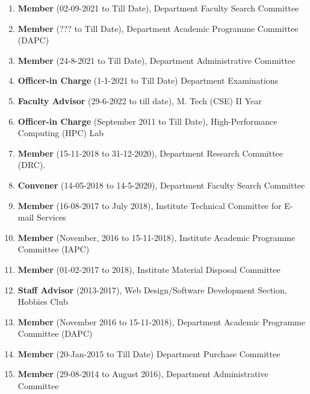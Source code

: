 \begin{enumerate}

\item
\textbf{Member} (02-09-2021 to Till Date), Department Faculty Search Committee

\item
\textbf{Member} (??? to Till Date), Department Academic Programme Committee (DAPC)

\item
\textbf{Member} (24-8-2021 to Till Date), Department Administrative Committee

\item
\textbf{Officer-in Charge} (1-1-2021 to Till Date) Department Examinations

\item 
\textbf{Faculty Advisor} (29-6-2022 to till date), M. Tech (CSE) II Year

\item
\textbf{Officer-in Charge} (September 2011 to Till Date), High-Performance Computing (HPC) Lab 

\item
\textbf{Member} (15-11-2018 to 31-12-2020), Department Research Committee (DRC).

\item
\textbf{Convener} (14-05-2018 to 14-5-2020), Department Faculty Search Committee

\item
\textbf{Member} (16-08-2017 to July 2018), Institute Technical Committee for E-mail Services

\item
\textbf{Member} (November, 2016 to 15-11-2018), Institute Academic Programme Committee (IAPC)

\item
\textbf{Member} (01-02-2017 to 2018), Institute Material Disposal Committee

\item 
\textbf{Staff Advisor} (2013-2017), Web Design/Software Development Section, Hobbies Club 

\item
\textbf{Member} (November 2016 to 15-11-2018), Department Academic Programme Committee (DAPC)

\item
\textbf{Member} (20-Jan-2015 to Till Date) Department Purchase Committee

\item
\textbf{Member} (29-08-2014 to August 2016), Department Administrative Committee


\end{enumerate}

